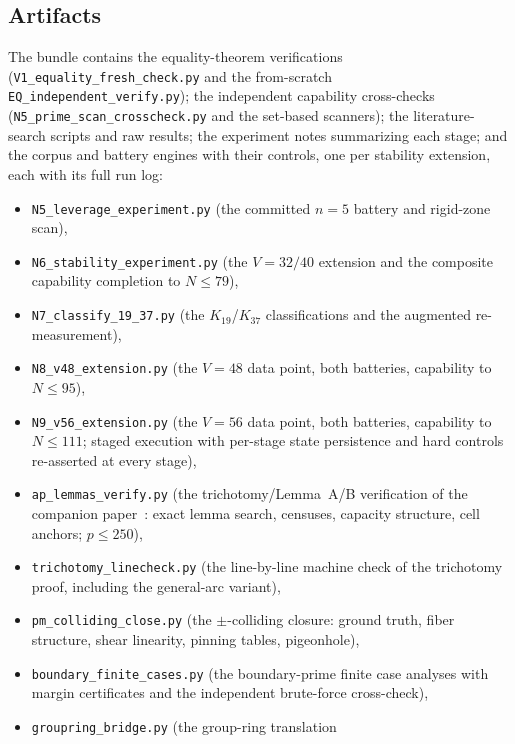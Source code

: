 \subsection{Artifacts}

\begingroup\sloppy
The bundle \cite{prog-artifacts} contains the equality-theorem
verifications (\texttt{V1\_equality\_fresh\_check.py} and the
from-scratch \texttt{EQ\_independent\_verify.py}); the independent
capability cross-checks (\texttt{N5\_prime\_scan\_crosscheck.py} and the
set-based scanners); the literature-search scripts and raw results; the
experiment notes summarizing each stage; and the corpus and battery
engines with their controls, one per stability extension, each with its
full run log:
\begin{itemize}[leftmargin=2.2em,itemsep=1pt,topsep=2pt]
  \item \texttt{N5\_leverage\_experiment.py} (the committed $n=5$
        battery and rigid-zone scan),
  \item \texttt{N6\_stability\_experiment.py} (the $V=32/40$ extension
        and the composite capability completion to $N\le79$),
  \item \texttt{N7\_classify\_19\_37.py} (the $K_{19}$/$K_{37}$
        classifications and the augmented re-measurement),
  \item \texttt{N8\_v48\_extension.py} (the $V=48$ data point, both
        batteries, capability to $N\le95$),
  \item \texttt{N9\_v56\_extension.py} (the $V=56$ data point, both
        batteries, capability to $N\le111$; staged execution with
        per-stage state persistence and hard controls re-asserted at
        every stage),
  \item \texttt{ap\_lemmas\_verify.py} (the trichotomy/Lemma~A/B
        verification of the companion paper~\cite{companion-paper}: exact lemma search,
        censuses, capacity structure, cell anchors; $p\le250$),
  \item \texttt{trichotomy\_linecheck.py} (the line-by-line machine
        check of the trichotomy proof, including the general-arc
        variant),
  \item \texttt{pm\_colliding\_close.py} (the $\pm$-colliding closure:
        ground truth, fiber structure, shear linearity, pinning tables,
        pigeonhole),
  \item \texttt{boundary\_finite\_cases.py} (the boundary-prime finite
        case analyses with margin certificates and the independent
        brute-force cross-check),
  \item \texttt{groupring\_bridge.py} (the group-ring translation

\end{itemize}
